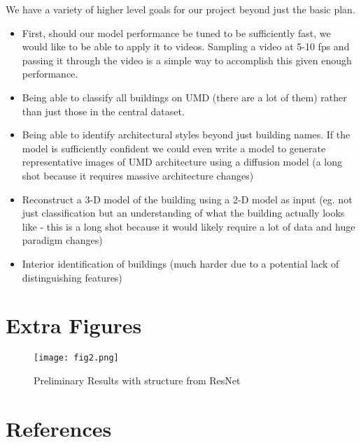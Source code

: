 \documentclass{article}
\begin{document}
We have a variety of higher level goals for our project beyond just the basic plan. \begin{itemize}
    \item First, should our model performance be tuned to be sufficiently fast, we would like to be able to apply it to videos. Sampling a video at 5-10 fps and passing it through the video is a simple way to accomplish this given enough performance.
    \item Being able to classify all buildings on UMD (there are a lot of them) rather than just those in the central dataset. 
    \item Being able to identify architectural styles beyond just building names. If the model is sufficiently confident we could even write a model to generate representative images of UMD architecture using a diffusion model (a long shot because it requires massive architecture changes)
    \item Reconstruct a 3-D model of the building using a 2-D model as input (eg. not just classification but an understanding of what the building actually looks like - this is a long shot because it would likely require a lot of data and huge paradigm changes)
    \item Interior identification of buildings (much harder due to a potential lack of distinguishing features)
\end{itemize}

\newpage 
\appendix

\section{Extra Figures}

\begin{figure}[H]
    \centering
    \texttt{[image: fig2.png]}
    \caption{Preliminary Results with structure from ResNet}
    \label{fig:prelim_results_2}
\end{figure}

\section*{References}
\label{cites}

\medskip
\end{document}
